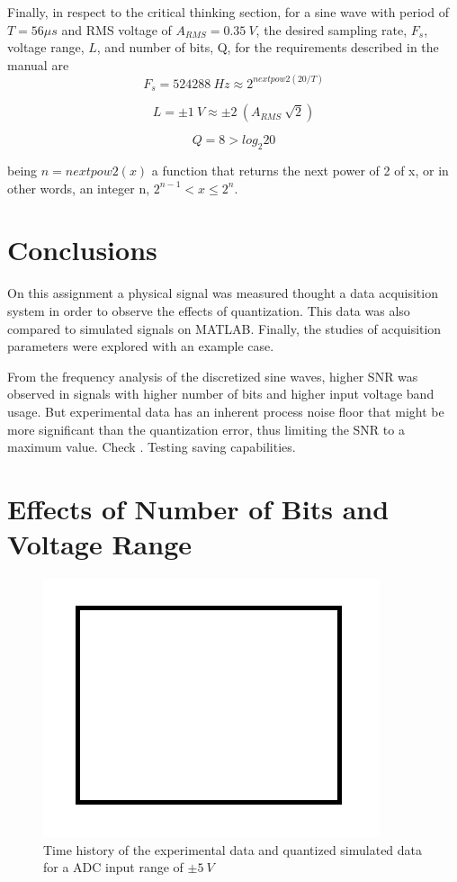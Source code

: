 \documentclass[10pt,letterpaper,twocolumn]{article}
\begin{document}
    Finally, in respect to the critical thinking section, for a sine wave with period of $T = 56 \mu s$ and RMS voltage of $A_{RMS} = 0.35\ V$, the desired sampling rate, $F_s$, voltage range, $L$, and number of bits, Q, for the requirements described in the manual are
    \begin{equation}
    F_s = 524288\ Hz \approx 2^{nextpow2(20/T)}
    \end{equation}
    
    \begin{equation}
    L = \pm 1\ V \approx \pm 2\ (A_{RMS}\ \sqrt 2)
    \end{equation}
    
    \begin{equation}
    Q = 8 > log_2 20
    \end{equation}
    
    being $n = nextpow2(x)$ a function that returns the next power of 2 of x, or in other words, an integer n, $2^{n-1} < x \leq 2^n$.
    
\section{Conclusions}
    On this assignment a physical signal was measured thought a data acquisition system in order to observe the effects of quantization. This data was also compared to simulated signals on MATLAB. Finally, the studies of acquisition parameters were explored with an example case.
    
    From the frequency analysis of the discretized sine waves, higher SNR was observed in signals with higher number of bits and higher input voltage band usage. But experimental data has an inherent process noise floor that might be more significant than the quantization error, thus limiting the SNR to a maximum value. Check \cite{einstein}. Testing saving capabilities.

\printbibliography

\onecolumn
\clearpage
\appendix
\appendixpage

\section{Effects of Number of Bits and Voltage Range}
    \begin{figure}[h]
    	\centering
        \includegraphics[width=0.6\linewidth]{img/sample}
        \captionsetup{width=0.6\textwidth}
        \caption{Time history of the experimental data and quantized simulated data for a ADC input range of $\pm 5\ V$}
        \label{fig:range5}
    \end{figure}
    
\end{document}
